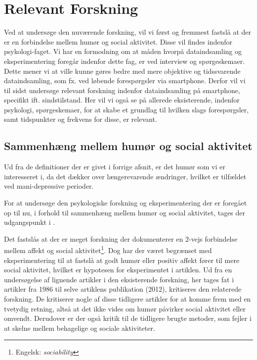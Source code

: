 

\chapter{Relevant Forskning}
Ved at undersøge den nuværende forskning, vil vi først og fremmest fastslå at der er en forbindelse mellem humør og social aktivitet.
Disse vil findes indenfor psykologi-faget.
Vi har en formodning om at måden hvorpå dataindsamling og eksperimentering foregår indenfor dette fag, er ved interview og spørgeskemaer.
Dette mener vi at ville kunne gøres bedre med mere objektive og tidssvarende dataindsamling, som fx. ved løbende forespørgsler via smartphone.
Derfor vil vi til sidst undersøge relevant forskning indenfor dataindsamling på smartphone, specifikt ift. sindstilstand.
Her vil vi også se på allerede eksisterende, indenfor psykologi, spørgeskemaer, for at skabe et grundlag til hvilken slags forespørgsler, samt tidspunkter og frekvens for disse, er relevant.

\section{Sammenhæng mellem humør og social aktivitet}
Ud fra de definitioner der er givet i forrige afsnit, er det humør som vi er interesseret i, da det dækker over længerevarende ændringer, hvilket er tilfældet ved mani-depressive perioder.

For at undersøge den psykologiske forskning og eksperimentering der er foregået op til nu, i forhold til sammenhæng mellem humør og social aktivitet, tages der udgangspunkt i \citet{whelan}.

Det fastslås at der er meget forskning der dokumenterer en 2-vejs forbindelse mellem affekt og social aktivitet\footnote{Engelsk: \textit{sociability}}.
Dog har der været begrænset med eksperimentering til at fastslå at godt humør eller positiv affekt fører til mere social aktivitet, hvilket er hypotesen for eksperimentet i artiklen.
Ud fra en undersøgelse af lignende artikler i den eksisterende forskning, her tages fat i artikler fra 1986 til selve artiklens publikation (2012), kritiseres den relaterede forskning.
De kritiserer nogle af disse tidligere artikler for at komme frem med en tvetydig retning, altså at det ikke vides om humør påvirker social aktivitet eller omvendt.
Derudover er der også kritik til de tidligere brugte metoder, som fejler i at skelne mellem behagelige og sociale aktiviteter.

